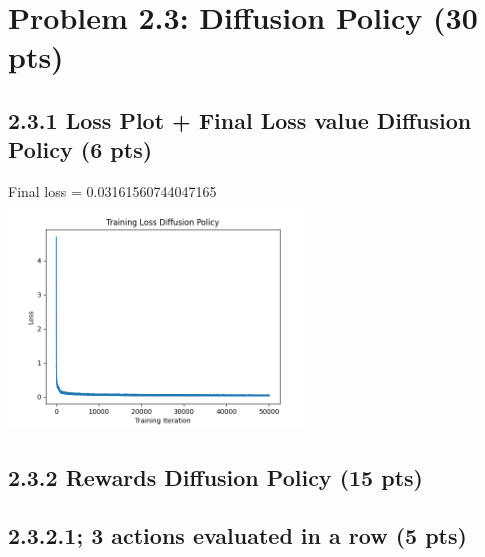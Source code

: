 \documentclass[12pt]{article}
\begin{document}
\newpage
\section*{Problem 2.3: Diffusion Policy (30 pts)}

\subsection*{2.3.1 Loss Plot + Final Loss value Diffusion Policy (6 pts)}
\begin{tcolorbox}[fit,height=30em, width=40em, blank, borderline={1pt}{1pt},nobeforeafter]
    \vspace*{2em}   
    \begin{center}
        Final loss = 0.03161560744047165
    \newline
    \centering
    \includegraphics[width=0.6\textwidth]{visuals/diffusion_policy_loss_3_actions_in_a_row.png}
     
    \end{center}     
   
            \end{tcolorbox}


\subsection*{2.3.2 Rewards Diffusion Policy (15 pts)}
\subsection*{2.3.2.1; 3 actions evaluated in a row (5 pts)}
\end{document}
